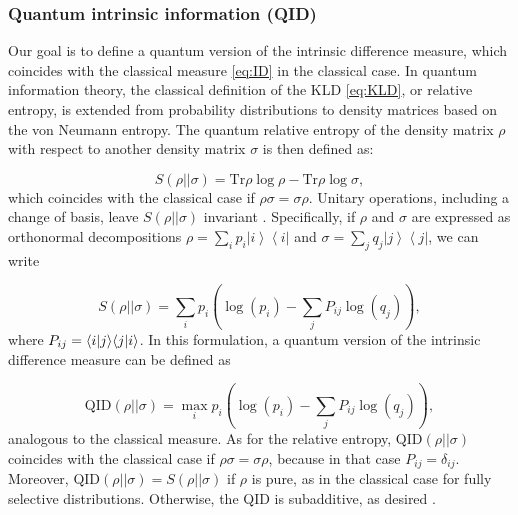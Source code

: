 \documentclass[preprints, article, accept, pdftex, moreauthors, letterpaper]{Definitions/mdpi}
\newcommand{\ket}[1]{\left| #1 \right>} %
\newcommand{\bra}[1]{\left< #1 \right|} %
\newcommand{\braket}[2]{\langle #1 \vphantom{#2} | #2 \vphantom{#1} \rangle} %
\renewcommand{\=}[1]{\stackrel{#1}{=}} %
\newcommand{\QID}{\text{QID}}
\newcommand{\Tr}{\text{Tr}}
\renewcommand{\*}{\otimes}%
\begin{document}
\subsubsection{Quantum intrinsic information (QID)}

Our goal is to define a quantum version of the intrinsic difference measure, which coincides with the classical measure \eqref{eq:ID} \cite{Barbosa2021} in the classical case. 
In quantum information theory, the classical definition of the KLD \eqref{eq:KLD}, or relative entropy, is extended from probability distributions to density matrices based on the von Neumann entropy. The quantum relative entropy of the density matrix $\rho$ with respect to another density matrix $\sigma$ is then defined as:

\begin{equation}
   S(\rho || \sigma) = \Tr \rho \log \rho - \Tr \rho \log \sigma,
\end{equation}
%
which coincides with the classical case if $\rho \sigma = \sigma \rho$. Unitary operations, including a change of basis, leave $S(\rho || \sigma)$ invariant \cite{Vedral2002}. 
Specifically, if $\rho$ and $\sigma$ are expressed as orthonormal decompositions $\rho = \sum_i p_i \ket{i}\bra{i}$ and $\sigma = \sum_j q_j \ket{j}\bra{j}$, we can write \cite{NielsonChuang2011}

\begin{equation}
   S(\rho || \sigma) = \sum_i p_i \left( \log (p_i) - \sum_j P_{ij} \log (q_j) \right),
\end{equation}
%
where $P_{ij} = \braket{i}{j} \braket{j}{i}$. In this formulation, a quantum version of the intrinsic difference measure can be defined as

\begin{equation}
\label{eq:QID}
   \QID(\rho || \sigma) = \max_i  p_i \left( \log (p_i) - \sum_j P_{ij} \log (q_j) \right),
\end{equation}
%
analogous to the classical measure. As for the relative entropy, $\QID(\rho || \sigma)$ coincides with the classical case if $\rho \sigma = \sigma \rho$, because in that case $P_{ij} = \delta_{ij}$. Moreover, $\QID(\rho || \sigma) = S(\rho || \sigma)$ if $\rho$ is pure, as in the classical case for fully selective distributions. Otherwise, the QID is subadditive, as desired \cite{Barbosa2020}.
\end{document}
